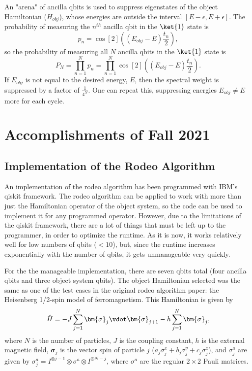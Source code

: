 \documentclass[
a4paper,
10pt,
twoside,
prd,
aps,
nofootinbib,
superscriptaddress,
floatfix,
preprintnumbers,
twocolumn
]{revtex4}
\begin{document}
An "arena" of ancilla qbits is used to suppress eigenstates of the object Hamiltonian ($H_{obj}$), whose energies are outside the interval $[E-\epsilon,E+\epsilon]$.
The probability of measuring the $n^{th}$ ancilla qbit in the $\ket{1}$ state is
\begin{equation}
	p_n = \cos[2]((E_{obj}-E)\frac{t_n}{2}),
\end{equation}
so the probability of measuring all $N$ ancilla qbits in the $\ket{1}$ state is
\begin{equation}
	P_N = \prod_{n=1}^N p_n = \prod_{n=1}^N \cos[2]((E_{obj}-E)\frac{t_n}{2}).
\end{equation}
If $E_{obj}$ is not equal to the desired energy, $E$, then the spectral weight is suppressed by a factor of $\frac{1}{4^N}$.
One can repeat this, suppressing energies $E_{obj}\neq E$ more for each cycle.

\section{Accomplishments of Fall 2021}
\subsection{Implementation of the Rodeo Algorithm}
An implementation of the rodeo algorithm has been programmed with IBM's qiskit framework.
The rodeo algorithm can be applied to work with more than just the Hamiltonian operator of the object system, so the code can be used to implement it for any programmed operator.
However, due to the limitations of the qiskit framework, there are a lot of things that must be left up to the programmer, in order to optimize the runtime.
As it is now, it works relatively well for low numbers of qbits ($<10$), but, since the runtime increases exponentially with the number of qbits, it gets unmanageable very quickly.

For the the manageable implementation, there are seven qbits total (four ancilla qbits and three object system qbits).
The object Hamiltonian selected was the same as one of the test cases in the original rodeo algorithm paper: the Heisenberg 1/2-spin model of ferromagnetism.
This Hamiltonian is given by
\begin{equation}
    \hat{H} = -J \sum_{j=1}^{N} \bm{\sigma}_j \vdot \bm{\sigma}_{j+1} - h\sum_{j=1}^{N} \bm{\sigma}_j,
\end{equation}
where $N$ is the number of particles, $J$ is the coupling constant, $h$ is the external magnetic field, $\bm{\sigma}_j$ is the vector spin of particle $j$ ($a_j\sigma_j^x+b_j\sigma_j^y+c_j\sigma_j^z$), and $\sigma_j^a$ are given by $\sigma_j^a = I^{\otimes j-1}\otimes \sigma^a \otimes I^{\otimes N-j}$, where $\sigma^a$ are the regular $2\times2$ Pauli matrices.
\end{document}
